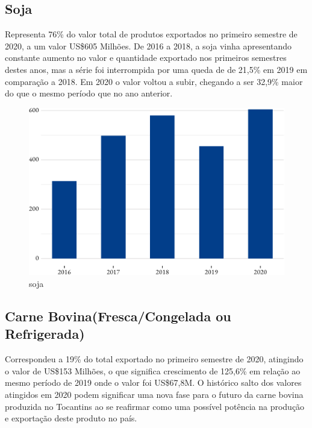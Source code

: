 \subsection{Soja}

\par Representa 76\% do valor total de produtos exportados no primeiro semestre de 2020, a um valor US\$605 Milhões. De 2016 a 2018, a soja vinha apresentando constante aumento no valor e quantidade exportado nos primeiros semestres destes anos, mas a série foi interrompida por uma queda de de 21,5\% em 2019 em comparação a 2018. Em 2020 o valor voltou a subir, chegando a ser 32,9\% maior do que o mesmo período que no ano anterior.

\begin{figure}[h] 
	\caption{soja}
	\includegraphics{fig/soja1-1.pdf}
\end{figure}

\subsection{Carne Bovina(Fresca/Congelada ou Refrigerada)}
Correspondeu a 19\% do total exportado no primeiro semestre de 2020, atingindo o valor de US\$153 Milhões, o que significa crescimento de 125,6\% em relação ao mesmo período de 2019 onde o valor foi US\$67,8M. O histórico salto dos valores atingidos em 2020 podem significar uma nova fase para o futuro da carne bovina produzida no Tocantins ao se reafirmar como uma possível potência na produção e exportação deste produto no país.


